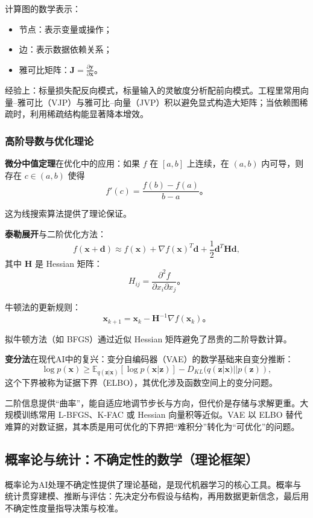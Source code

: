 计算图的数学表示：
\begin{itemize}
  \item 节点：表示变量或操作；
  \item 边：表示数据依赖关系；
  \item 雅可比矩阵：$\mathbf{J} = \frac{\partial \mathbf{y}}{\partial \mathbf{x}}$。
\end{itemize}

经验上：标量损失配反向模式，标量输入的灵敏度分析配前向模式。工程里常用向量–雅可比（VJP）与雅可比–向量（JVP）积以避免显式构造大矩阵；当依赖图稀疏时，利用稀疏结构能显著降本增效。

\subsubsection{高阶导数与优化理论}

\textbf{微分中值定理}在优化中的应用：如果 $f$ 在 $[a,b]$ 上连续，在 $(a,b)$ 内可导，则存在 $c \in (a,b)$ 使得
$$
f'(c) = \frac{f(b) - f(a)}{b - a}。
$$

这为线搜索算法提供了理论保证。

\textbf{泰勒展开}与二阶优化方法：
$$
f(\mathbf{x} + \mathbf{d}) \approx f(\mathbf{x}) + \nabla f(\mathbf{x})^T \mathbf{d} + \frac{1}{2}\mathbf{d}^T \mathbf{H} \mathbf{d},
$$
其中 $\mathbf{H}$ 是 Hessian 矩阵：
$$
H_{ij} = \frac{\partial^2 f}{\partial x_i \partial x_j}。
$$

牛顿法的更新规则：
$$
\mathbf{x}_{k+1} = \mathbf{x}_k - \mathbf{H}^{-1} \nabla f(\mathbf{x}_k)。
$$

拟牛顿方法（如 BFGS）通过近似 Hessian 矩阵避免了昂贵的二阶导数计算。

\textbf{变分法}在现代AI中的复兴：变分自编码器（VAE）的数学基础来自变分推断：
$$
\log p(\mathbf{x}) \geq \mathbb{E}_{q(\mathbf{z}|\mathbf{x})}[\log p(\mathbf{x}|\mathbf{z})] - D_{KL}(q(\mathbf{z}|\mathbf{x})||p(\mathbf{z})),
$$
这个下界被称为证据下界（ELBO），其优化涉及函数空间上的变分问题。

二阶信息提供“曲率”，能自适应地调节步长与方向，但代价是存储与求解更重。大规模训练常用 L-BFGS、K-FAC 或 Hessian 向量积等近似。VAE 以 ELBO 替代难算的对数证据，其本质是用可优化的下界把“难积分”转化为“可优化”的问题。

\subsection{概率论与统计：不确定性的数学（理论框架）}

概率论为AI处理不确定性提供了理论基础，是现代机器学习的核心工具。概率与统计贯穿建模、推断与评估：先决定分布假设与结构，再用数据更新信念，最后用不确定性度量指导决策与校准。

